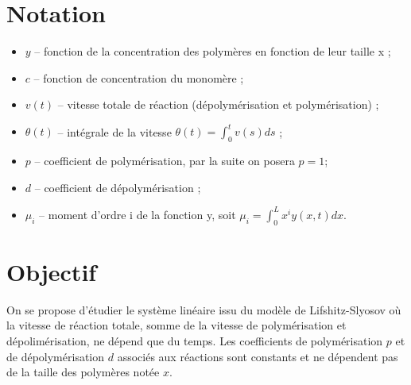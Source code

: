 \documentclass[a4paper]{article}
\newcommand{\pol}{p}
\newcommand{\dep}{d}
\begin{document}
\section{Notation}

\begin{itemize}
\item $y$ -- fonction de la concentration des polymères en fonction de leur taille x ;
\item $c$ -- fonction de concentration du monomère ;
\item $v(t)$ -- vitesse totale de réaction (dépolymérisation et polymérisation) ;
\item $\theta(t)$ -- intégrale de la vitesse $\theta(t)=\int_0^t v(s)ds$ ;
\item $\pol$ -- coefficient de polymérisation, par la suite on posera $\pol=1$;
\item $\dep$ -- coefficient de dépolymérisation ;
\item $\mu_i$ -- moment d'ordre i de la fonction y, soit $\mu_i = \int_0^L x^i y(x,t)dx$.
\end{itemize}


\section{Objectif}

On se propose d'étudier le système linéaire issu du modèle de Lifshitz-Slyosov où la vitesse de réaction totale, 
somme de la vitesse de polymérisation et dépolimérisation, ne dépend que du temps. 
Les coefficients de polymérisation $\pol$ et de dépolymérisation $\dep$ associés aux réactions sont constants 
et ne dépendent pas de la taille des polymères notée $x$. 
\end{document}
